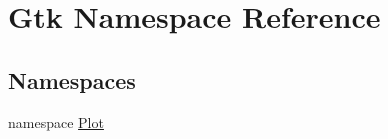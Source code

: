 \hypertarget{namespaceGtk}{
\section{Gtk Namespace Reference}
\label{namespaceGtk}
}
\subsection*{Namespaces}
\begin{DoxyCompactItemize}
\item 
namespace \hyperlink{namespaceGtk_1_1Plot}{Plot}
\end{DoxyCompactItemize}
